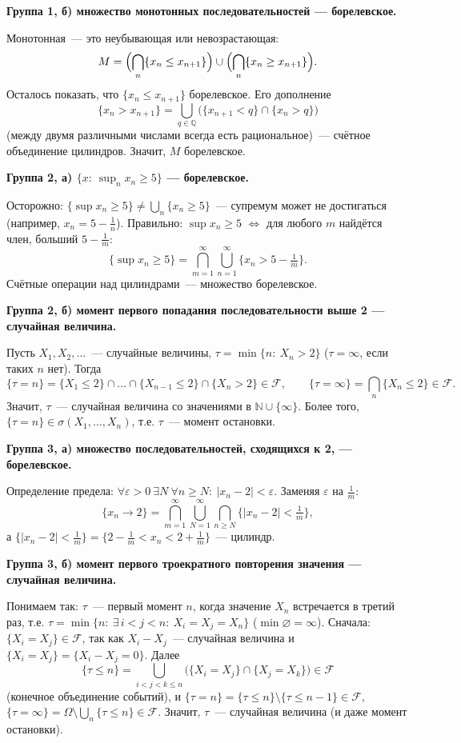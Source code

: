 \documentclass[11pt,a4paper]{article}
\theoremstyle{definition}
\newcommand{\N}{\mathbb N}
\newcommand{\Q}{\mathbb Q}
\newcommand{\F}{\mathcal F}
\newcommand{\1}{\mathbf 1}
\newenvironment{task}[1]{\par\medskip\noindent\colorbox{black!7}{\parbox{\dimexpr\linewidth-2\fboxsep}{\textbf{#1}}}\par\smallskip}{\par}
\begin{document}
\begin{task}{Группа 1, б) множество монотонных последовательностей --- борелевское.}
\end{task}
Монотонная~--- это неубывающая или невозрастающая:
\[
M=\Bigl(\bigcap_{n}\{x_n\le x_{n+1}\}\Bigr)\cup\Bigl(\bigcap_{n}\{x_n\ge x_{n+1}\}\Bigr).
\]
Осталось показать, что $\{x_n\le x_{n+1}\}$ борелевское. Его дополнение
\[
\{x_n>x_{n+1}\}=\bigcup_{q\in\Q}\bigl(\{x_{n+1}<q\}\cap\{x_n>q\}\bigr)
\]
(между двумя различными числами всегда есть рациональное)~--- счётное
объединение цилиндров. Значит, $M$ борелевское.

\begin{task}{Группа 2, а) $\{x:\ \sup_n x_n\ge5\}$ --- борелевское.}
\end{task}
Осторожно: $\{\sup x_n\ge5\}\neq\bigcup_n\{x_n\ge5\}$~--- супремум может не
достигаться (например, $x_n=5-\frac1n$). Правильно: $\sup x_n\ge5$ $\iff$ для
любого $m$ найдётся член, больший $5-\frac1m$:
\[
\{\sup x_n\ge5\}=\bigcap_{m=1}^\infty\bigcup_{n=1}^\infty\{x_n>5-\tfrac1m\}.
\]
Счётные операции над цилиндрами~--- множество борелевское.

\begin{task}{Группа 2, б) момент первого попадания последовательности выше 2 --- случайная величина.}
\end{task}
Пусть $X_1,X_2,\dots$~--- случайные величины,
$\tau=\min\{n:\ X_n>2\}$ ($\tau=\infty$, если таких $n$ нет). Тогда
\[
\{\tau=n\}=\{X_1\le2\}\cap\dots\cap\{X_{n-1}\le2\}\cap\{X_n>2\}\in\F,
\qquad
\{\tau=\infty\}=\bigcap_{n}\{X_n\le2\}\in\F .
\]
Значит, $\tau$~--- случайная величина со значениями в $\N\cup\{\infty\}$.
Более того, $\{\tau=n\}\in\sigma(X_1,\dots,X_n)$, т.е. $\tau$~--- момент
остановки.

\begin{task}{Группа 3, а) множество последовательностей, сходящихся к 2, --- борелевское.}
\end{task}
Определение предела: $\forall\varepsilon>0\ \exists N\ \forall n\ge N:\
|x_n-2|<\varepsilon$. Заменяя $\varepsilon$ на $\frac1m$:
\[
\{x_n\to2\}=\bigcap_{m=1}^\infty\bigcup_{N=1}^\infty\bigcap_{n\ge N}\{|x_n-2|<\tfrac1m\},
\]
а $\{|x_n-2|<\frac1m\}=\{2-\frac1m<x_n<2+\frac1m\}$~--- цилиндр.

\begin{task}{Группа 3, б) момент первого троекратного повторения значения --- случайная величина.}
\end{task}
Понимаем так: $\tau$~--- первый момент $n$, когда значение $X_n$ встречается
в третий раз, т.е.
$\tau=\min\{n:\ \exists\,i<j<n:\ X_i=X_j=X_n\}$ ($\min\varnothing=\infty$).
Сначала: $\{X_i=X_j\}\in\F$, так как $X_i-X_j$~--- случайная величина и
$\{X_i=X_j\}=\{X_i-X_j=0\}$. Далее
\[
\{\tau\le n\}=\bigcup_{i<j<k\le n}\bigl(\{X_i=X_j\}\cap\{X_j=X_k\}\bigr)\in\F
\]
(конечное объединение событий), и
$\{\tau=n\}=\{\tau\le n\}\setminus\{\tau\le n-1\}\in\F$,
$\{\tau=\infty\}=\Omega\setminus\bigcup_n\{\tau\le n\}\in\F$.
Значит, $\tau$~--- случайная величина (и даже момент остановки).
\end{document}
